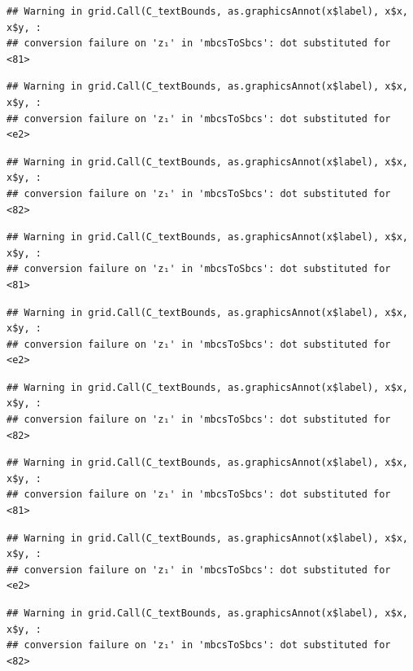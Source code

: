 \documentclass[]{article}
\begin{document}
\begin{verbatim}
## Warning in grid.Call(C_textBounds, as.graphicsAnnot(x$label), x$x, x$y, :
## conversion failure on 'z₁' in 'mbcsToSbcs': dot substituted for <81>
\end{verbatim}

\begin{verbatim}
## Warning in grid.Call(C_textBounds, as.graphicsAnnot(x$label), x$x, x$y, :
## conversion failure on 'z₁' in 'mbcsToSbcs': dot substituted for <e2>
\end{verbatim}

\begin{verbatim}
## Warning in grid.Call(C_textBounds, as.graphicsAnnot(x$label), x$x, x$y, :
## conversion failure on 'z₁' in 'mbcsToSbcs': dot substituted for <82>
\end{verbatim}

\begin{verbatim}
## Warning in grid.Call(C_textBounds, as.graphicsAnnot(x$label), x$x, x$y, :
## conversion failure on 'z₁' in 'mbcsToSbcs': dot substituted for <81>
\end{verbatim}

\begin{verbatim}
## Warning in grid.Call(C_textBounds, as.graphicsAnnot(x$label), x$x, x$y, :
## conversion failure on 'z₁' in 'mbcsToSbcs': dot substituted for <e2>
\end{verbatim}

\begin{verbatim}
## Warning in grid.Call(C_textBounds, as.graphicsAnnot(x$label), x$x, x$y, :
## conversion failure on 'z₁' in 'mbcsToSbcs': dot substituted for <82>
\end{verbatim}

\begin{verbatim}
## Warning in grid.Call(C_textBounds, as.graphicsAnnot(x$label), x$x, x$y, :
## conversion failure on 'z₁' in 'mbcsToSbcs': dot substituted for <81>
\end{verbatim}

\begin{verbatim}
## Warning in grid.Call(C_textBounds, as.graphicsAnnot(x$label), x$x, x$y, :
## conversion failure on 'z₁' in 'mbcsToSbcs': dot substituted for <e2>
\end{verbatim}

\begin{verbatim}
## Warning in grid.Call(C_textBounds, as.graphicsAnnot(x$label), x$x, x$y, :
## conversion failure on 'z₁' in 'mbcsToSbcs': dot substituted for <82>
\end{verbatim}
\end{document}
